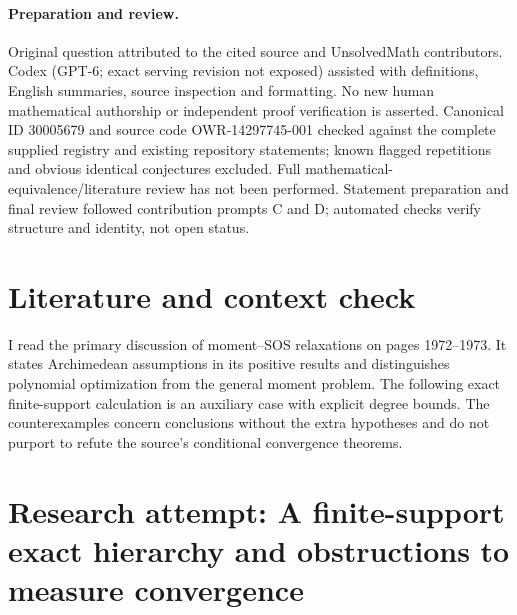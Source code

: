 \documentclass[11pt]{article}
\begin{document}
\paragraph{Preparation and review.}
Original question attributed to the cited source and UnsolvedMath contributors. Codex (GPT-6; exact serving revision not exposed) assisted with definitions, English summaries, source inspection and formatting. No new human mathematical authorship or independent proof verification is asserted. Canonical ID 30005679 and source code OWR-14297745-001 checked against the complete supplied registry and existing repository statements; known flagged repetitions and obvious identical conjectures excluded. Full mathematical-equivalence/literature review has not been performed. Statement preparation and final review followed contribution prompts C and D; automated checks verify structure and identity, not open status.
\label{end:30005679}

\section{Literature and context check}

I read the primary discussion of moment--SOS relaxations on pages 1972--1973.
It states Archimedean assumptions in its positive results and distinguishes
polynomial optimization from the general moment problem. The following exact
finite-support calculation is an auxiliary case with explicit degree bounds.
The counterexamples concern conclusions without the extra hypotheses and do
not purport to refute the source's conditional convergence theorems.

\section{Research attempt: A finite-support exact hierarchy and obstructions to measure convergence}
\end{document}

